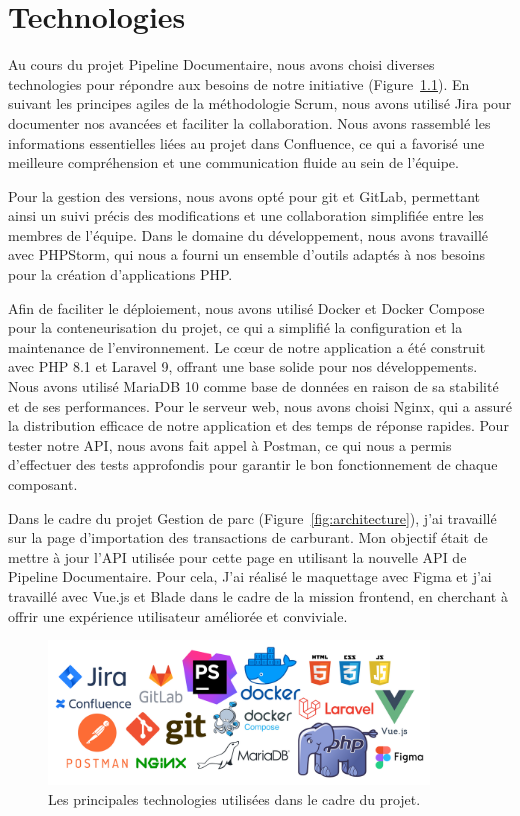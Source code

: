 \chapter{Technologies}\label{ch:technologies}

Au cours du projet Pipeline Documentaire, nous avons choisi diverses technologies pour répondre aux besoins de notre initiative (Figure~\ref{fig:technologies}). En suivant les principes agiles de la méthodologie Scrum, nous avons utilisé Jira pour documenter nos avancées et faciliter la collaboration. Nous avons rassemblé les informations essentielles liées au projet dans Con\-flu\-ence, ce qui a favorisé une meilleure compréhension et une communication fluide au sein de l'équipe.

Pour la gestion des versions, nous avons opté pour git et GitLab, permettant ainsi un suivi précis des modifications et une collaboration simplifiée entre les membres de l'équipe. Dans le domaine du développement, nous avons travaillé avec PHP\-Storm, qui nous a fourni un ensemble d'outils adaptés à nos besoins pour la création d'applications PHP.

Afin de faciliter le déploiement, nous avons utilisé Docker et Docker Compose pour la conteneurisation du projet, ce qui a simplifié la configuration et la maintenance de l'environnement. Le cœur de notre application a été construit avec PHP 8.1 et Laravel 9, offrant une base solide pour nos développements. Nous avons utilisé MariaDB 10 comme base de données en raison de sa stabilité et de ses performances. Pour le serveur web, nous avons choisi Nginx, qui a assuré la distribution efficace de notre application et des temps de réponse rapides. Pour tester notre API, nous avons fait appel à Postman, ce qui nous a permis d'effectuer des tests approfondis pour garantir le bon fonctionnement de chaque composant.

Dans le cadre du projet Gestion de parc (Figure~\ref{fig:architecture}), j'ai travaillé sur la page d'importation des transactions de carburant. Mon objectif était de mettre à jour l'API utilisée pour cette page en utilisant la nouvelle API de Pipeline Documentaire. Pour cela, J'ai réalisé le maquettage avec Figma et j'ai travaillé avec Vue.js et Blade dans le cadre de la mission frontend, en cherchant à offrir une expérience utilisateur améliorée et conviviale.

\begin{figure}[ht]
    \centering
    \includegraphics[width=0.9\textwidth]{img/technologies01}
    \caption{Les principales technologies utilisées dans le cadre du projet.}
    \label{fig:technologies}
\end{figure}